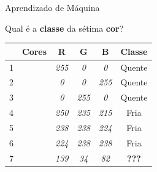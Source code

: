   \begin{frame}[fragile]{Aprendizado de Máquina}

    \centering
    Qual é a \textbf{classe} da sétima \textbf{cor}?

    \begin{table}[]
    \centering
    \begin{tabular}{l|c|c|c|c|c|}
    \cline{2-6}
                            & \textbf{Cores}           & \textbf{R}   & \textbf{G}   & \textbf{B}   & \textbf{Classe} \\ \hline
    \multicolumn{1}{|l|}{1} & \cellcolor[HTML]{FF0000} & \textit{255} & \textit{0}   & \textit{0}   & Quente          \\ \hline
    \multicolumn{1}{|l|}{2} & \cellcolor[HTML]{0000FF} & \textit{0}   & \textit{0}   & \textit{255} & Quente          \\ \hline
    \multicolumn{1}{|l|}{3} & \cellcolor[HTML]{00FF00} & \textit{0}   & \textit{255} & \textit{0}   & Quente          \\ \hline
    \multicolumn{1}{|l|}{4} & \cellcolor[HTML]{FAEBD7} & \textit{250} & \textit{235} & \textit{215} & Fria            \\ \hline
    \multicolumn{1}{|l|}{5} & \cellcolor[HTML]{EEEEE0} & \textit{238} & \textit{238} & \textit{224} & Fria            \\ \hline
    \multicolumn{1}{|l|}{6} & \cellcolor[HTML]{E0EEEE} & \textit{224} & \textit{238} & \textit{238} & Fria            \\ \hline
    \multicolumn{1}{|l|}{7} & \cellcolor[HTML]{8B2252} & \textit{139} & \textit{34}  & \textit{82}  & \textbf{???}               \\ \hline
    \end{tabular}
    \label{my-label}
    \end{table}
  \end{frame}

